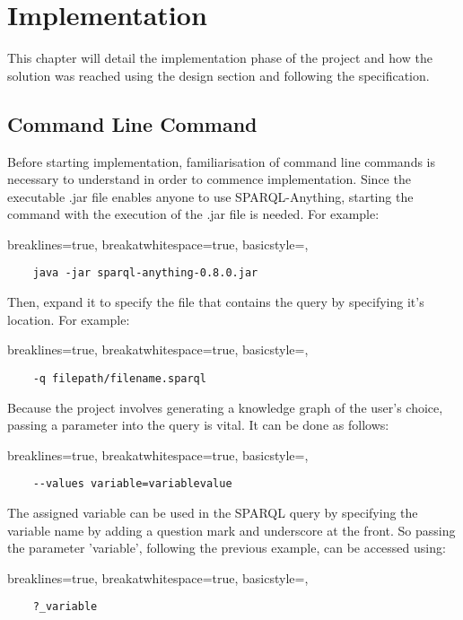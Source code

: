 \chapter{Implementation}
This chapter will detail the implementation phase of the project and how the solution was reached using the design section and following the specification. 

\section{Command Line Command}
\hspace*{0.5cm} Before starting implementation, familiarisation of command line commands is necessary to understand in order to commence implementation. Since the executable .jar file enables anyone to use SPARQL-Anything, starting the command with the execution of the .jar file is needed. For example:

\lstset
{
    breaklines=true,
    breakatwhitespace=true,
    basicstyle=\ttfamily,
}
\begin{lstlisting}
    java -jar sparql-anything-0.8.0.jar 
\end{lstlisting}

\noindent Then, expand it to specify the file that contains the query by specifying it's location. For example:

\lstset
{
    breaklines=true,
    breakatwhitespace=true,
    basicstyle=\ttfamily,
}
\begin{lstlisting}
    -q filepath/filename.sparql
\end{lstlisting}

\noindent Because the project involves generating a knowledge graph of the user's choice, passing a parameter into the query is vital. It can be done as follows: 

\lstset
{
    breaklines=true,
    breakatwhitespace=true,
    basicstyle=\ttfamily,
}
\begin{lstlisting}
    --values variable=variablevalue
\end{lstlisting}

\noindent The assigned variable can be used in the SPARQL query by specifying the variable name by adding a question mark and underscore at the front. So passing the parameter 'variable', following the previous example, can be accessed using:

\lstset
{
    breaklines=true,
    breakatwhitespace=true,
    basicstyle=\ttfamily,
}
\begin{lstlisting}
    ?_variable
\end{lstlisting}

